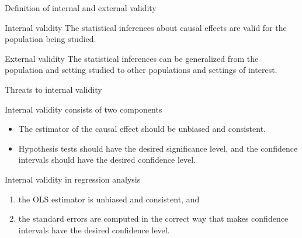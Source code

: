 \documentclass[presentation,10pt]{beamer}
\begin{document}
\begin{frame}[label={sec:org9920855}]{Definition of internal and external validity}
\begin{block}{Internal validity}
The statistical inferences about causal effects are valid for the
population being studied.
\end{block}

\begin{block}{External validity}
The statistical inferences can be generalized from the population and
setting studied to other populations and settings of interest. 
\end{block}
\end{frame}

\begin{frame}[label={sec:org05e3142}]{Threats to internal validity}
\begin{block}{Internal validity consists of two components}
\begin{itemize}
\item The estimator of the causal effect should be unbiased and
consistent.
\item Hypothesis tests should have the desired significance level, and the
confidence intervals should have the desired confidence level.
\end{itemize}
\end{block}

\begin{block}{Internal validity in regression analysis}
\begin{enumerate}
\item the OLS estimator is unbiased and consistent, and
\item the standard errors are computed in the correct way that makes
confidence intervals have the desired confidence level.
\end{enumerate}
\end{block}
\end{frame}
\end{document}
